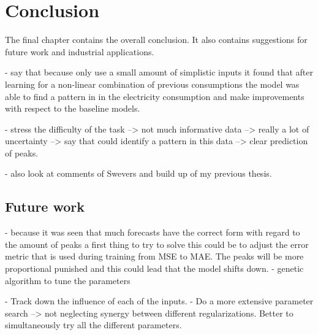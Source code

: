 \chapter{Conclusion}
\label{cha:conclusion}
The final chapter contains the overall conclusion. It also contains
suggestions for future work and industrial applications.

- say that because only use a small amount of simplistic inputs it found that after learning for a non-linear combination of previous consumptions the model was able to find a pattern in in the electricity consumption and make improvements with respect to the baseline models.

- stress the difficulty of the task --> not much informative data --> really a lot of uncertainty --> say that could identify a pattern in this data --> clear prediction of peaks.

- also look at comments of Swevers and build up of my previous thesis.

\section{Future work}
- because it was seen that much forecasts have the correct form with regard to the amount of peaks a first thing to try to solve this could be to adjust the error metric that is used during training from MSE to MAE. The peaks will be more proportional punished and this could lead that the model shifts down. 
- genetic algorithm to tune the parameters

- Track down the influence of each of the inputs.
- Do a more extensive parameter search --> not neglecting synergy between different regularizations. Better to simultaneously try all the different parameters.

